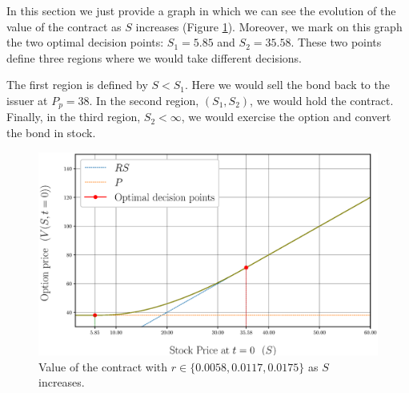 In this section we just provide a graph in which we can see the evolution of the value of the contract as $S$ increases (Figure \ref{optimalPoints}). Moreover, we mark on this graph the two optimal decision points: $S_1 = 5.85$ and $S_2 = 35.58$. These two points define three regions where we would take different decisions. 

The first region is defined by $S<S_1$. Here we would sell the bond back to the issuer at $P_p=38$. In the second region, $(S_1,S_2)$, we would hold the contract. Finally, in the third region, $S_2 <\infty$, we would exercise the option and convert the bond in stock.
\vspace{-0.4cm}
\begin{figure}[h!]
	\centering
	\includegraphics[scale=0.43]{img/Q2/amConvBondValues_incrS_OptimalDecisionPoints}
	\caption{Value of the contract with $r\in\{0.0058,0.0117,0.0175\}$ as $S$ increases.}\label{optimalPoints}
\end{figure}
\vspace{-0.4cm}
